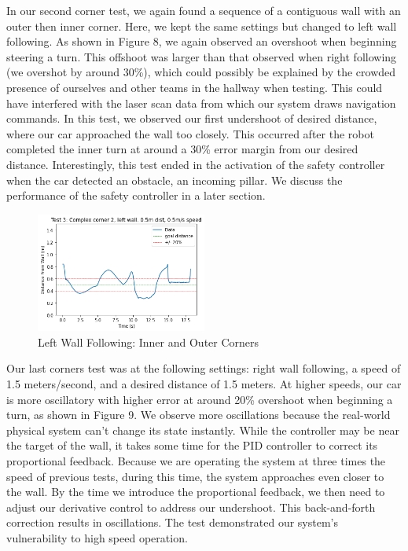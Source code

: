 \documentclass{article}
\begin{document}
In our second corner test, we again found a sequence of a contiguous wall with an outer then inner corner. Here, we kept the same settings but changed to left wall following. As shown in Figure 8, we again observed an overshoot when beginning steering a turn. This offshoot was larger than that observed when right following (we overshot by around 30\%), which could possibly be explained by the crowded presence of ourselves and other teams in the hallway when testing. This could have interfered with the laser scan data from which our system draws navigation commands. In this test, we observed our first undershoot of desired distance, where our car approached the wall too closely. This occurred after the robot completed the inner turn at around a 30\% error margin from our desired distance. Interestingly, this test ended in the activation of the safety controller when the car detected an obstacle, an incoming pillar. We discuss the performance of the safety controller in a later section.\\

\begin{figure}[H]
\begin{center}
\includegraphics[width=0.5\textwidth]{plot3.png} %
\caption{Left Wall Following: Inner and Outer Corners}
\end{center}
\label{workflow}
\end{figure}

Our last corners test was at the following settings: right wall following, a speed of 1.5 meters/second, and a desired distance of 1.5 meters. At higher speeds, our car is more oscillatory with higher error at around 20\% overshoot when beginning a turn, as shown in Figure 9. We observe more oscillations because the real-world physical system can't change its state instantly. While the controller may be near the target of the wall, it takes some time for the PID controller to correct its proportional feedback. Because we are operating the system at three times the speed of previous tests, during this time, the system approaches even closer to the wall. By the time we introduce the proportional feedback, we  then need to adjust our derivative control to address our undershoot. This back-and-forth correction results in oscillations. The test demonstrated our system's vulnerability to high speed operation.\\
\end{document}
